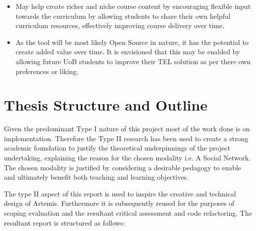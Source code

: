 \begin{itemize}
    \item May help create richer and niche course content by encouraging flexible input towards the curriculum by allowing students to share their own helpful curriculum resources, effectively improving course delivery over time.
    
    \item As the tool will be most likely Open Source in nature, it has the potential to create added value over time. It is envisioned that this may be enabled by allowing future UoB students to improve their TEL solution as per there own preferences or liking.
    
\end{itemize}









\section{Thesis Structure and Outline}
\label{sec1:sec04}

Given the predominant Type I nature of this project most of the work done is on implementation. Therefore the Type II research has been used to create a strong academic foundation to justify the theoretical underpinnings of the project undertaking, explaining the reason for the chosen modality i.e. A Social Network. The chosen modality is justified by considering a desirable pedagogy to enable and ultimately benefit both teaching and learning objectives.

The type II aspect of this report is used to inspire the creative and technical design of Artemis. Furthermore it is subsequently  reused for the purposes of scoping evaluation and the resultant critical assessment and code refactoring. The resultant report is structured as follows:


